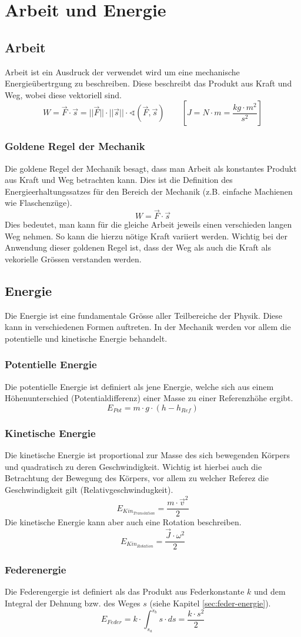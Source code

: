 \chapter{Arbeit und Energie}

\section{Arbeit}
Arbeit ist ein Ausdruck der verwendet wird um eine mechanische 
Energieübertrgung zu beschreiben. Diese beschreibt das Produkt aus
Kraft und Weg, wobei diese vektoriell sind.
\[ \boxed{ W = \vec{F} \cdot \vec{s} 
	= ||\vec{F}|| \cdot ||\vec{s}|| \cdot 
	\sphericalangle \left( \vec{F}, \vec{s} \right) } 
	\qquad \left[ J = N \cdot m = \frac{kg \cdot m^2}{s^2} \right] \]

\subsection{Goldene Regel der Mechanik}
Die goldene Regel der Mechanik besagt, dass man Arbeit als konstantes 
Produkt aus Kraft und Weg betrachten kann. Dies ist die Definition des
Energieerhaltungssatzes für den Bereich der Mechanik (z.B. einfache
Machienen wie Flaschenzüge). 
\[ \boxed{W = \vec{F} \cdot \vec{s}} \] 
Dies bedeutet, man kann für die gleiche Arbeit jeweils einen verschieden
langen Weg nehmen. So kann die hierzu nötige Kraft variiert werden. 
Wichtig bei der Anwendung dieser goldenen Regel ist, dass der Weg als
auch die Kraft als vekorielle Grössen verstanden werden. 

\section{Energie}
Die Energie ist eine fundamentale Grösse aller Teilbereiche der Physik.
Diese kann in verschiedenen Formen auftreten. In der Mechanik werden vor
allem die potentielle und kinetische Energie behandelt.

\subsection{Potentielle Energie}
Die potentielle Energie ist definiert als jene Energie, welche sich aus
einem Höhenunterschied (Potentialdifferenz) einer Masse zu einer 
Referenzhöhe ergibt. 
\[ \boxed{ E_{Pot} = m \cdot g \cdot (h - h_{Ref}) } \]

\subsection{Kinetische Energie}
Die kinetische Energie ist proportional zur Masse des sich bewegenden Körpers
und quadratisch zu deren Geschwindigkeit. Wichtig ist hierbei auch die 
Betrachtung der Bewegung des Körpers, vor allem zu welcher Referez die 
Geschwindigkeit gilt (Relativgeschwindugkeit).
\[ \boxed{ E_{Kin_{Translation}} = \frac{m \cdot \vec{v}^2}{2} } \]
Die kinetische Energie kann aber auch eine Rotation beschreiben.
\[ \boxed{ E_{Kin_{Rotation}} = \frac{\vec{J} \cdot \omega^2}{2} } \]

\subsection{Federenergie}
Die Federengergie ist definiert als das Produkt aus Federkonstante $k$ und 
dem Integral der Dehnung bzw. des Weges $s$ 
(siehe Kapitel \ref{sec:feder-energie}).
\[ \boxed{E_{Feder} = k \cdot \int_{s_a}^{s_b} s \cdot ds = \frac{k \cdot s^2}{2}} \]

